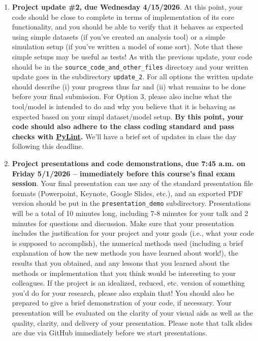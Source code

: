 \documentclass[10pt]{article}
\begin{document}
\begin{enumerate}
\item \textbf{Project update \#2, due Wednesday 4/15/2026}.  At this
point, your code should be close to complete in terms of
implementation of its core functionality, and you should be able to
verify that it behaves as expected using simple datasets (if you've
created an analysis tool) or a simple simulation setup (if you've
written a model of some sort).  Note that these simple setups may be
useful as tests!  As with the previous update, your code should be in
the \texttt{source\_code\_and\_other\_files} directory and your
written update goes in the subdirectory \texttt{update\_2}.  For all
options the written update should describe (i) your progress thus far
and (ii) what remains to be done before your final submission.  For
Option 3, please also inclue what the tool/model is intended to do and
why you believe that it is behaving as expected based on your simpl
dataset/model setup.  \textbf{By this point, your code should also
adhere to the class coding standard and pass checks with
\href{https://pypi.org/project/pylint/}{PyLint}.}  We'll have a brief
set of updates in class the  day following this deadline.

\item \textbf{Project presentations and code demonstrations, due 7:45
    a.m. on Friday 5/1/2026 -- immediately before this course's final
    exam session}. Your final
presentation can use any of the standard presentation file formats
(Powerpoint, Keynote, Google Slides, etc.), and an exported PDF
version should be put in the \texttt{presentation\_demo} subdirectory.
Presentations will be a total of 10 minutes long, including 7-8
minutes for your talk and 2 minutes for questions and discussion.
Make sure that your presentation includes the justification for your
project and your goals (i.e., what your code is supposed to
accomplish), the numerical methods used (including a brief explanation
of how the new methods you have learned about work!), the results that
you obtained, and any lessons that you learned about the methods or
implementation that you think would be interesting to your colleagues.
If the project is an idealized, reduced, etc. version of something
you'd do for your research, please also explain that!  You should also
be prepared to give a brief demonstration of your code, if necessary.
Your presentation will be evaluated on the clarity of your visual aids
as well as the quality, clarity, and delivery of your presentation.
Please note that talk slides are due via GitHub immediately before we
start presentations.


\end{enumerate}
\end{document}
